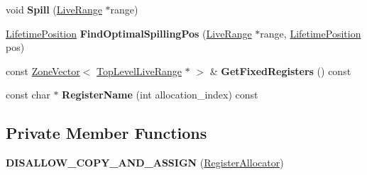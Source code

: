 \begin{DoxyCompactItemize}
\item 
void {\bfseries Spill} (\hyperlink{classv8_1_1internal_1_1compiler_1_1_live_range}{Live\+Range} $\ast$range)\hypertarget{classv8_1_1internal_1_1compiler_1_1_register_allocator_a629789d8d5ce5de31c3a5c8011a592fc}{}\label{classv8_1_1internal_1_1compiler_1_1_register_allocator_a629789d8d5ce5de31c3a5c8011a592fc}

\item 
\hyperlink{classv8_1_1internal_1_1compiler_1_1_lifetime_position}{Lifetime\+Position} {\bfseries Find\+Optimal\+Spilling\+Pos} (\hyperlink{classv8_1_1internal_1_1compiler_1_1_live_range}{Live\+Range} $\ast$range, \hyperlink{classv8_1_1internal_1_1compiler_1_1_lifetime_position}{Lifetime\+Position} pos)\hypertarget{classv8_1_1internal_1_1compiler_1_1_register_allocator_ad30a3b9ae9719de4e5bd9f1f6b2e3fbf}{}\label{classv8_1_1internal_1_1compiler_1_1_register_allocator_ad30a3b9ae9719de4e5bd9f1f6b2e3fbf}

\item 
const \hyperlink{classv8_1_1internal_1_1_zone_vector}{Zone\+Vector}$<$ \hyperlink{classv8_1_1internal_1_1compiler_1_1_top_level_live_range}{Top\+Level\+Live\+Range} $\ast$ $>$ \& {\bfseries Get\+Fixed\+Registers} () const \hypertarget{classv8_1_1internal_1_1compiler_1_1_register_allocator_a21c3780ae0c5c42842f8f2deea40965e}{}\label{classv8_1_1internal_1_1compiler_1_1_register_allocator_a21c3780ae0c5c42842f8f2deea40965e}

\item 
const char $\ast$ {\bfseries Register\+Name} (int allocation\+\_\+index) const \hypertarget{classv8_1_1internal_1_1compiler_1_1_register_allocator_a7015eedaf5fc0dc5fc74603356cbcaed}{}\label{classv8_1_1internal_1_1compiler_1_1_register_allocator_a7015eedaf5fc0dc5fc74603356cbcaed}

\end{DoxyCompactItemize}
\subsection*{Private Member Functions}
\begin{DoxyCompactItemize}
\item 
{\bfseries D\+I\+S\+A\+L\+L\+O\+W\+\_\+\+C\+O\+P\+Y\+\_\+\+A\+N\+D\+\_\+\+A\+S\+S\+I\+GN} (\hyperlink{classv8_1_1internal_1_1compiler_1_1_register_allocator}{Register\+Allocator})\hypertarget{classv8_1_1internal_1_1compiler_1_1_register_allocator_a143210eb178c57ef96d6ee88eeef7945}{}\label{classv8_1_1internal_1_1compiler_1_1_register_allocator_a143210eb178c57ef96d6ee88eeef7945}

\end{DoxyCompactItemize}
